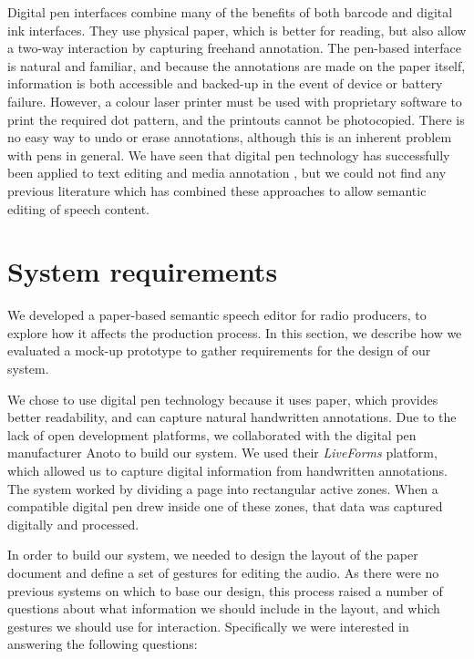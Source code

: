 Digital pen interfaces combine many of the benefits of both barcode and digital ink interfaces. They use physical
paper, which is better for reading, but also allow a two-way interaction by capturing freehand annotation. The
pen-based interface is natural and familiar, and because the annotations are made on the paper itself, information is
both accessible and backed-up in the event of device or battery failure. However, a colour laser printer must be used
with proprietary software to print the required dot pattern, and the printouts cannot be photocopied. There is no easy
way to undo or erase annotations, although this is an inherent problem with pens in general.  We have seen that digital
pen technology has successfully been applied to text editing \citep{Weibel2008} and media annotation \citep{Fouse2011},
but we could not find any previous literature which has combined these approaches to allow semantic editing of speech
content.











\section{System requirements}\label{sec:paper-requirements}

We developed a paper-based semantic speech editor for radio producers, to explore how it affects the production
process.  In this section, we describe how we evaluated a mock-up prototype to gather requirements for the design of
our system.

We chose to use digital pen technology because it uses paper, which provides better readability, and can capture
natural handwritten annotations.  Due to the lack of open development platforms, we collaborated with the digital pen
manufacturer Anoto to build our system.  We used their \textit{Live\texttrademark Forms} platform, which allowed us to
capture digital information from handwritten annotations.  The system worked by dividing a page into rectangular active
zones. When a compatible digital pen drew inside one of these zones, that data was captured digitally and processed.

In order to build our system, we needed to design the layout of the paper document and define a set of gestures for
editing the audio.  As there were no previous systems on which to base our design, this process raised a number of
questions about what information we should include in the layout, and which gestures we should use for interaction.
Specifically we were interested in answering the following questions:

